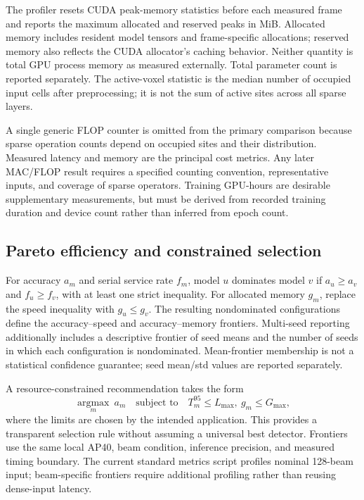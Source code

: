 \documentclass[10pt,twocolumn]{article}
\begin{document}
The profiler resets CUDA peak-memory statistics before each measured frame and reports the maximum allocated and reserved peaks in MiB. Allocated memory includes resident model tensors and frame-specific allocations; reserved memory also reflects the CUDA allocator's caching behavior. Neither quantity is total GPU process memory as measured externally. Total parameter count is reported separately. The active-voxel statistic is the median number of occupied input cells after preprocessing; it is not the sum of active sites across all sparse layers.

A single generic FLOP counter is omitted from the primary comparison because sparse operation counts depend on occupied sites and their distribution. Measured latency and memory are the principal cost metrics. Any later MAC/FLOP result requires a specified counting convention, representative inputs, and coverage of sparse operators. Training GPU-hours are desirable supplementary measurements, but must be derived from recorded training duration and device count rather than inferred from epoch count.

\subsection{Pareto efficiency and constrained selection}
For accuracy $a_m$ and serial service rate $f_m$, model $u$ dominates model $v$ if $a_u\geq a_v$ and $f_u\geq f_v$, with at least one strict inequality. For allocated memory $g_m$, replace the speed inequality with $g_u\leq g_v$. The resulting nondominated configurations define the accuracy--speed and accuracy--memory frontiers. Multi-seed reporting additionally includes a descriptive frontier of seed means and the number of seeds in which each configuration is nondominated. Mean-frontier membership is not a statistical confidence guarantee; seed mean/std values are reported separately.

A resource-constrained recommendation takes the form
\begin{equation}
\underset{m}{\operatorname{argmax}}\ a_m\quad\text{subject to}\quad T^{95}_m\leq L_{\max},\ g_m\leq G_{\max},
\end{equation}
where the limits are chosen by the intended application. This provides a transparent selection rule without assuming a universal best detector. Frontiers use the same local AP40, beam condition, inference precision, and measured timing boundary. The current standard metrics script profiles nominal 128-beam input; beam-specific frontiers require additional profiling rather than reusing dense-input latency.
\end{document}
